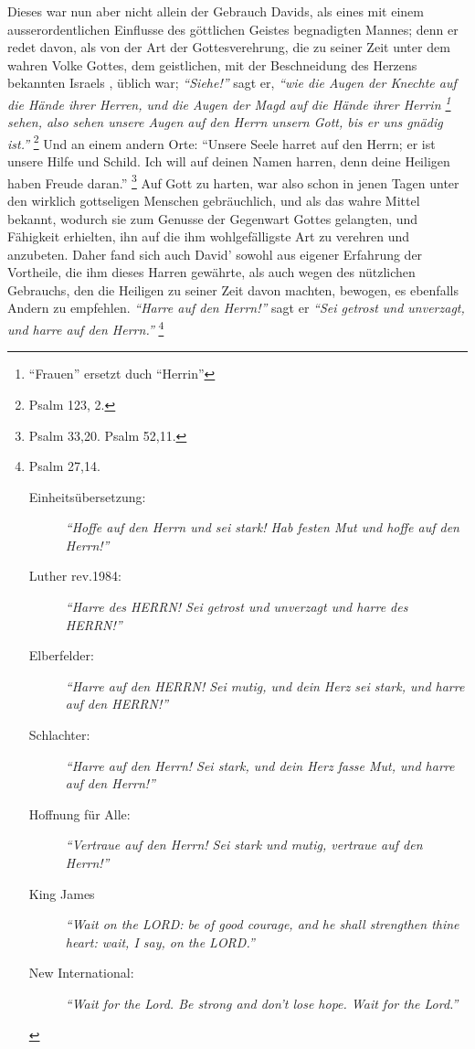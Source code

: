 \medskip

Dieses war nun aber nicht allein der Gebrauch Davids, als eines mit einem
ausserordentlichen Einflusse des göttlichen Geistes begnadigten Mannes; denn er
redet davon, als von der Art der Gottesverehrung, die zu seiner Zeit unter dem
wahren Volke Gottes, dem geistlichen, mit der
Beschneidung des Herzens  bekannten
Israels  , üblich war; \textit{"`Siehe!"'} sagt er,
\textit{"`wie die Augen der Knechte auf die
Hände ihrer Herren, und die Augen der Magd auf die Hände ihrer Herrin
\footnote{"`Frauen"' ersetzt duch "`Herrin"'} sehen,
also sehen unsere Augen auf den Herrn unsern Gott, bis er uns gnädig
ist."'} 
\footnote{Psalm 123, 2.}
Und an einem andern Orte:
"`Unsere Seele harret auf den Herrn; er ist unsere Hilfe und Schild. Ich will
auf deinen Namen harren,
denn deine Heiligen haben Freude daran."'
\footnote{Psalm 33,20.  Psalm 52,11.}
Auf Gott zu harten, war also schon in jenen Tagen unter den wirklich gottseligen
Menschen gebräuchlich, und als das wahre Mittel bekannt, wodurch sie zum Genusse
der Gegenwart Gottes  gelangten, und Fähigkeit
erhielten, ihn auf die ihm
wohlgefälligste Art zu verehren und anzubeten. Daher fand sich auch David'
sowohl aus eigener Erfahrung der Vortheile, die ihm
dieses Harren gewährte, als
auch wegen des nützlichen Gebrauchs, den die Heiligen zu seiner Zeit davon
machten, bewogen, es ebenfalls Andern zu empfehlen.
\textit{"`Harre auf den Herrn!"'}  sagt
er
\textit{"`Sei getrost und unverzagt, und harre auf den Herrn."'}
\footnote{Psalm 27,14.
\begin{description}
 \item[Einheitsübersetzung:] \textit{"`Hoffe auf den Herrn und sei stark! Hab
festen Mut und hoffe auf den Herrn!"'}
 \item[Luther rev.1984:] \textit{"`Harre des HERRN! Sei getrost und unverzagt
und harre des HERRN!"'} 
 \item[Elberfelder:] \textit{"`Harre auf den HERRN! Sei mutig, und dein Herz sei
stark, und harre auf den HERRN!"'}
 \item[Schlachter:] \textit{"`Harre auf den Herrn! Sei stark, und dein Herz
fasse Mut, und harre auf den Herrn!"'}
 \item[Hoffnung für Alle:] \textit{"`Vertraue auf den Herrn! Sei stark und
mutig, vertraue auf den Herrn!"'}
 \item[King James] 
\textit{ "`Wait on the LORD: be of good courage, and he shall strengthen thine
heart: wait, I say, on the LORD."'}
 \item[New International:] \textit{ "`Wait for the Lord. Be strong and don't
lose hope. Wait for the Lord."'}
 \end{description}
}
